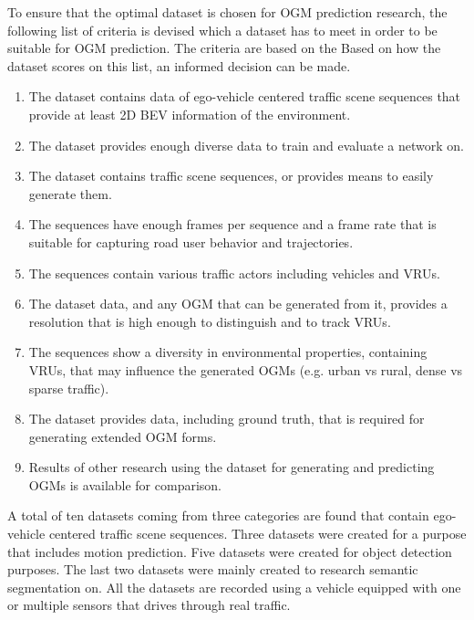 To ensure that the optimal dataset is chosen for \gls{OGM} prediction research, the following list of criteria is devised which a dataset has to meet in order to be suitable for \gls{OGM} prediction. The criteria are based on the  Based on how the dataset scores on this list, an informed decision can be made. 

\begin{enumerate}
	\item The dataset contains data of ego-vehicle centered traffic scene sequences that provide at least 2D \gls{BEV} information of the environment.
	\item The dataset provides enough diverse data to train and evaluate a network on.
	\item The dataset contains traffic scene sequences, or provides means to easily generate them.
	\item The sequences have enough frames per sequence and a frame rate that is suitable for capturing road user behavior and trajectories.
	\item The sequences contain various traffic actors including vehicles and \glspl{VRU}.
	\item The dataset data, and any \gls{OGM} that can be generated from it, provides a resolution that is high enough to distinguish and to track \glspl{VRU}. 	
	\item The sequences show a diversity in environmental properties, containing \glspl{VRU}, that may influence the generated \glspl{OGM} (e.g. urban vs rural, dense vs sparse traffic).
	\item The dataset provides data, including ground truth, that is required for generating extended \gls{OGM} forms.
	\item Results of other research using the dataset for generating and predicting \glspl{OGM} is available for comparison. 
\end{enumerate}


A total of ten datasets coming from three categories are found that contain ego-vehicle centered traffic scene sequences. Three datasets were created for a purpose that includes motion prediction. Five datasets were created for object detection purposes. The last two datasets were mainly created to research semantic segmentation on. All the datasets are recorded using a vehicle equipped with one or multiple sensors that drives through real traffic. \\

